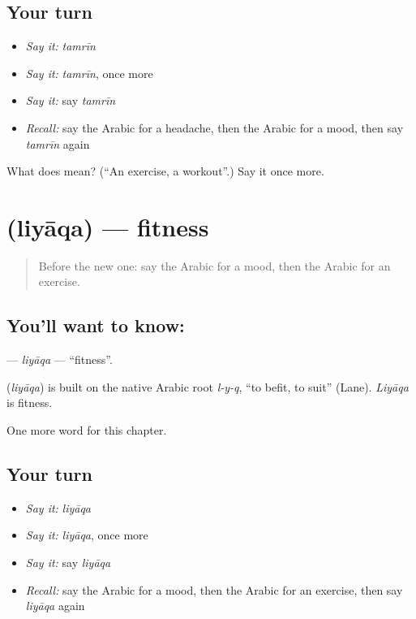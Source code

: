 \subsection*{Your turn}
\begin{itemize}
\raggedright
  \item \emph{Say it:} \emph{tamrīn}
  \item \emph{Say it:} \emph{tamrīn}, once more
  \item \emph{Say it:} say \emph{tamrīn}
  \item \emph{Recall:} say the Arabic for a headache, then the Arabic for a mood, then say \emph{tamrīn} again
\end{itemize}

\begin{tcolorbox}[breakable,colback=teal!4,colframe=teal!35!black,title={Before you move on}]
What does  mean? (\textquotedblleft{}An exercise, a workout\textquotedblright{}.) Say it once more.
\end{tcolorbox}
\section[\texorpdfstring{\ar{لياقة} (liyāqa)}{لياقة (liyāqa)}]{ (liyāqa) — fitness}

\label{lesson:AR-C169-liyaqa}



\begin{quote}
Before the new one: say the Arabic for a mood, then the Arabic for an exercise.
\end{quote}

\subsection*{You'll want to know: }
\textbf{} — \emph{liyāqa} — \textquotedblleft{}fitness\textquotedblright{}.

\begin{cousinweb}
\textbf{} (\emph{liyāqa}) is built on the native Arabic root \emph{l-y-q}, \textquotedblleft{}to befit, to suit\textquotedblright{} (Lane). \emph{Liyāqa} is fitness.
\end{cousinweb}

\begin{grammarlens}[title={What you've built}]
One more word for this chapter.
\end{grammarlens}

\subsection*{Your turn}
\begin{itemize}
\raggedright
  \item \emph{Say it:} \emph{liyāqa}
  \item \emph{Say it:} \emph{liyāqa}, once more
  \item \emph{Say it:} say \emph{liyāqa}
  \item \emph{Recall:} say the Arabic for a mood, then the Arabic for an exercise, then say \emph{liyāqa} again
\end{itemize}

